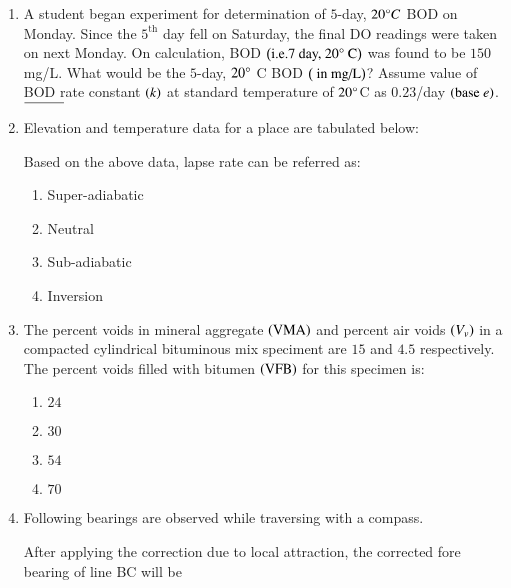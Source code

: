 \documentclass[journal,onecolumn]{IEEEtran}
\theoremstyle{remark}
\begin{document}
\begin{enumerate}
    \item A student began experiment for determination of $5$-day, $20\degree C$ BOD on Monday. Since the $5^{\text{th}}$ day fell on Saturday, the final DO readings were taken on next Monday. On calculation, BOD $\left(\text{i.e.} 7 \text{ day, } 20\degree \text{ C}\right)$ was found to be $150$ mg/L. What would be the $5$-day, $20\degree$ C BOD $\left(\text{ in mg/L}\right)$? Assume value of BOD rate constant $\left(k\right)$ at standard temperature of $20\degree$C as $0.23$/day $\left(\text{base } e\right)$. $\rule{1cm}{0.15mm}$ 
	\hfill{}

    \item Elevation and temperature data for a place are tabulated below:
	\begin{table}[h!]
		\centering
		
		\label{taba1.q44}
	\end{table}
	Based on the above data, lapse rate can be referred as:
	\hfill{}

	\begin{enumerate}
		\item Super-adiabatic
		\item Neutral
		\item Sub-adiabatic
		\item Inversion
	\end{enumerate}

    \item The percent voids in mineral aggregate $\left(\text{VMA}\right)$ and percent air voids $\left(V_v\right)$ in a compacted cylindrical bituminous mix speciment are $15$ and $4.5$ respectively. The percent voids filled with bitumen $\left(\text{VFB}\right)$ for this specimen is:
	\hfill{}
	\begin{enumerate}
		\item $24$
		\item $30$
		\item $54$
		\item $70$
	\end{enumerate}


    \item Following bearings are observed while traversing with a compass.
	\hfill{}
	\begin{table}[h!]
		\centering
		
		\label{taba1.q46}
	\end{table}
	After applying the correction due to local attraction, the corrected fore bearing of line BC will be


\end{enumerate}
\end{document}
